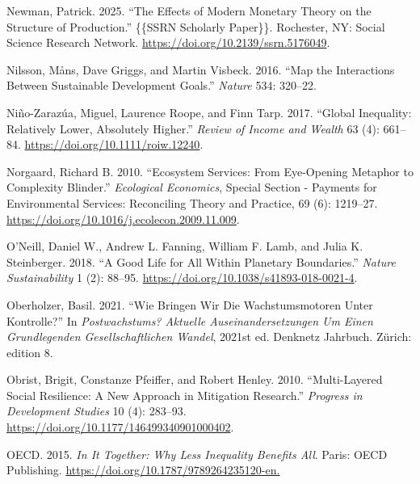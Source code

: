 \documentclass[
  a4paper,
  openany]{book}
\newlength{\cslhangindent}
\newenvironment{CSLReferences}[2] %
 {\begin{list}{}{%
  \setlength{\itemindent}{0pt}
  \setlength{\leftmargin}{0pt}
  \setlength{\parsep}{0pt}
  \ifodd #1
   \setlength{\leftmargin}{\cslhangindent}
   \setlength{\itemindent}{-1\cslhangindent}
  \fi
  \setlength{\itemsep}{#2\baselineskip}}}
 {\end{list}}
\begin{document}
\begin{CSLReferences}{1}{0}
Newman, Patrick. 2025. {``The {Effects} of {Modern Monetary Theory} on
the {Structure} of {Production}.''} \{\{SSRN Scholarly Paper\}\}.
Rochester, NY: Social Science Research Network.
\url{https://doi.org/10.2139/ssrn.5176049}.

Nilsson, Måns, Dave Griggs, and Martin Visbeck. 2016. {``Map the
Interactions Between {Sustainable Development Goals}.''} \emph{Nature}
534: 320--22.

Niño-Zarazúa, Miguel, Laurence Roope, and Finn Tarp. 2017. {``Global
{Inequality}: {Relatively Lower}, {Absolutely Higher}.''} \emph{Review
of Income and Wealth} 63 (4): 661--84.
\url{https://doi.org/10.1111/roiw.12240}.

Norgaard, Richard B. 2010. {``Ecosystem Services: {From} Eye-Opening
Metaphor to Complexity Blinder.''} \emph{Ecological Economics}, Special
{Section} - {Payments} for {Environmental Services}: {Reconciling
Theory} and {Practice}, 69 (6): 1219--27.
\url{https://doi.org/10.1016/j.ecolecon.2009.11.009}.

O'Neill, Daniel W., Andrew L. Fanning, William F. Lamb, and Julia K.
Steinberger. 2018. {``A Good Life for All Within Planetary
Boundaries.''} \emph{Nature Sustainability} 1 (2): 88--95.
\url{https://doi.org/10.1038/s41893-018-0021-4}.

Oberholzer, Basil. 2021. {``Wie Bringen Wir Die {Wachstumsmotoren} Unter
{Kontrolle}?''} In \emph{Postwachstums? {Aktuelle Auseinandersetzungen}
Um Einen Grundlegenden Gesellschaftlichen {Wandel}}, 2021st ed. Denknetz
{Jahrbuch}. Zürich: edition 8.

Obrist, Brigit, Constanze Pfeiffer, and Robert Henley. 2010.
{``Multi-Layered Social Resilience: A New Approach in Mitigation
Research.''} \emph{Progress in Development Studies} 10 (4): 283--93.
\url{https://doi.org/10.1177/146499340901000402}.

OECD. 2015. \emph{In {It Together}: {Why Less Inequality Benefits All}}.
Paris: OECD Publishing. \url{https://doi.org/10.1787/9789264235120-en.}


\end{CSLReferences}
\end{document}
